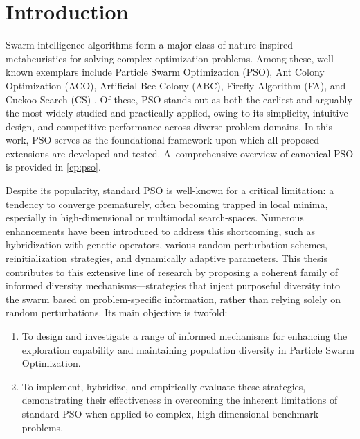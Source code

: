 
\chapter{Introduction}
\label{cp:introduction}

{



Swarm intelligence algorithms form a major class of nature-inspired \glspl{metaheuristic} for solving complex \glspl{optimization-problem}. Among these, well-known exemplars include Particle Swarm Optimization (PSO), Ant Colony Optimization (ACO), Artificial Bee Colony (ABC), Firefly Algorithm (FA), and Cuckoo Search (CS) \citep[see,][]{kennedy1995particle,dorigo1999aco,karaboga2005abc,yang2009firefly,yang2009cuckoo}. Of these, PSO stands out as both the earliest and arguably the most widely studied and practically applied, owing to its simplicity, intuitive design, and competitive performance across diverse problem domains. In this work, PSO serves as the foundational framework upon which all proposed extensions are developed and tested. A~comprehensive overview of canonical PSO is provided in \autoref{cp:pso}.

Despite its popularity, standard PSO is well-known for a critical limitation: a tendency to converge prematurely, often becoming trapped in local minima, especially in high-dimensional or multimodal \glspl{search-space}. Numerous enhancements have been introduced to address this shortcoming, such as hybridization with genetic operators, various random perturbation schemes, reinitialization strategies, and dynamically adaptive parameters. This thesis contributes to this extensive line of research by proposing a coherent family of informed diversity mechanisms---strategies that inject purposeful diversity into the swarm based on problem-specific information, rather than relying solely on random perturbations.
Its main objective is twofold:
\begin{enumerate}
\item To design and investigate a range of informed mechanisms for enhancing the exploration capability and maintaining population diversity in Particle Swarm Optimization.
\item To implement, hybridize, and empirically evaluate these strategies, demonstrating their effectiveness in overcoming the inherent limitations of standard PSO when applied to complex, high-dimensional benchmark problems.
\end{enumerate}

}
